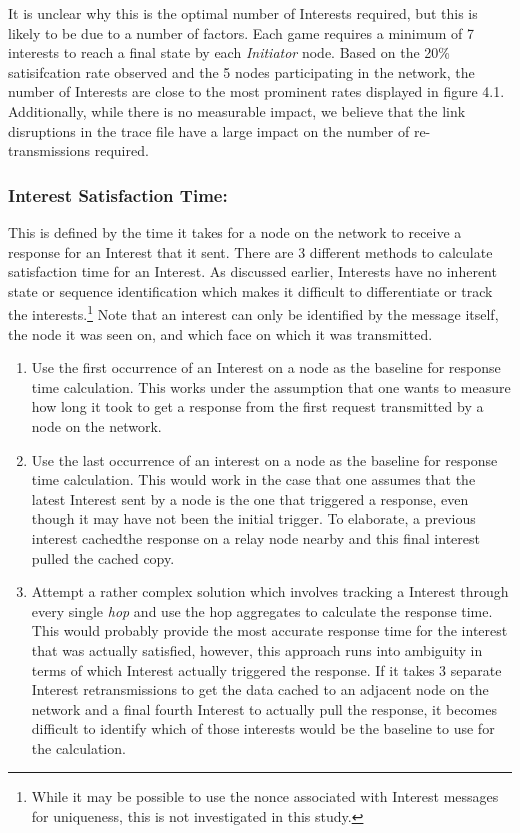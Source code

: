 \documentclass[a4paper,12pt]{report}      %
\begin{document}
\begin{descripton}
It is unclear why this is the optimal number of Interests required, but this is likely to be due to a number of factors.
Each game requires a minimum of 7 interests to reach a final state by each \emph{Initiator} node. Based on the
20\% satisifcation rate observed and the 5 nodes participating in the network, the number of Interests are close to
the most prominent rates displayed in figure 4.1. Additionally, while there is no measurable impact, we believe that the link disruptions 
in the trace file have a large impact on the number of re-transmissions required.  


\subsubsection{Interest Satisfaction Time:}

This is defined by the time it takes for a node on the network to receive a response for an Interest that it
sent. There are 3 different methods to calculate satisfaction time for an Interest. As discussed earlier,
Interests have no inherent state or sequence identification which makes it difficult to differentiate or
track the interests.\footnote{While it may be possible to use the nonce associated with Interest messages for uniqueness, this is not investigated in this study.} 
Note that an interest can only be identified by the message itself, the node it was seen on, and which face on which it was transmitted.

\begin{enumerate}
\item Use the first occurrence of an Interest on a node as the baseline for response time calculation. This
works under the assumption that one wants to measure how long it took to get a response from the first
request transmitted by a node on the network.
\item Use the last occurrence of an interest on a node as the baseline for response time calculation. This
would work in the case that one assumes that the latest Interest sent by a node is the one that triggered a
response, even though it may have not been the initial trigger. To elaborate, a previous interest cachedthe response on a relay node nearby and this final interest pulled the cached copy.
\item Attempt a rather complex solution which involves tracking a Interest through every single \textsl{hop} and
use the hop aggregates to calculate the response time. This would probably provide the most accurate
response time for the interest that was actually satisfied, however, this approach runs into ambiguity in
terms of which Interest actually triggered the response. If it takes 3 separate Interest retransmissions to
get the data cached to an adjacent node on the network and a final fourth Interest to actually pull the
response, it becomes difficult to identify which of those interests would be the baseline to use for the
calculation.
\end{enumerate}


\end{descripton}
\end{document}
